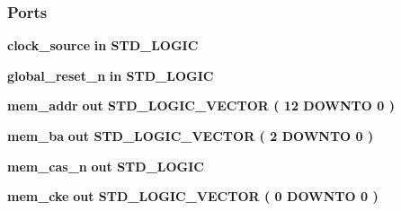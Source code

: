\subsubsection*{Ports}
 \begin{DoxyCompactItemize}
\item 
{\bf clock\+\_\+source}  {\bfseries {\bfseries \textcolor{keywordflow}{in}\textcolor{vhdlchar}{ }}} {\bfseries \textcolor{comment}{S\+T\+D\+\_\+\+L\+O\+G\+IC}\textcolor{vhdlchar}{ }} 
\item 
{\bf global\+\_\+reset\+\_\+n}  {\bfseries {\bfseries \textcolor{keywordflow}{in}\textcolor{vhdlchar}{ }}} {\bfseries \textcolor{comment}{S\+T\+D\+\_\+\+L\+O\+G\+IC}\textcolor{vhdlchar}{ }} 
\item 
{\bf mem\+\_\+addr}  {\bfseries {\bfseries \textcolor{keywordflow}{out}\textcolor{vhdlchar}{ }}} {\bfseries \textcolor{comment}{S\+T\+D\+\_\+\+L\+O\+G\+I\+C\+\_\+\+V\+E\+C\+T\+OR}\textcolor{vhdlchar}{ }\textcolor{vhdlchar}{(}\textcolor{vhdlchar}{ }\textcolor{vhdlchar}{ } \textcolor{vhdldigit}{12} \textcolor{vhdlchar}{ }\textcolor{keywordflow}{D\+O\+W\+N\+TO}\textcolor{vhdlchar}{ }\textcolor{vhdlchar}{ } \textcolor{vhdldigit}{0} \textcolor{vhdlchar}{ }\textcolor{vhdlchar}{)}\textcolor{vhdlchar}{ }} 
\item 
{\bf mem\+\_\+ba}  {\bfseries {\bfseries \textcolor{keywordflow}{out}\textcolor{vhdlchar}{ }}} {\bfseries \textcolor{comment}{S\+T\+D\+\_\+\+L\+O\+G\+I\+C\+\_\+\+V\+E\+C\+T\+OR}\textcolor{vhdlchar}{ }\textcolor{vhdlchar}{(}\textcolor{vhdlchar}{ }\textcolor{vhdlchar}{ } \textcolor{vhdldigit}{2} \textcolor{vhdlchar}{ }\textcolor{keywordflow}{D\+O\+W\+N\+TO}\textcolor{vhdlchar}{ }\textcolor{vhdlchar}{ } \textcolor{vhdldigit}{0} \textcolor{vhdlchar}{ }\textcolor{vhdlchar}{)}\textcolor{vhdlchar}{ }} 
\item 
{\bf mem\+\_\+cas\+\_\+n}  {\bfseries {\bfseries \textcolor{keywordflow}{out}\textcolor{vhdlchar}{ }}} {\bfseries \textcolor{comment}{S\+T\+D\+\_\+\+L\+O\+G\+IC}\textcolor{vhdlchar}{ }} 
\item 
{\bf mem\+\_\+cke}  {\bfseries {\bfseries \textcolor{keywordflow}{out}\textcolor{vhdlchar}{ }}} {\bfseries \textcolor{comment}{S\+T\+D\+\_\+\+L\+O\+G\+I\+C\+\_\+\+V\+E\+C\+T\+OR}\textcolor{vhdlchar}{ }\textcolor{vhdlchar}{(}\textcolor{vhdlchar}{ }\textcolor{vhdlchar}{ } \textcolor{vhdldigit}{0} \textcolor{vhdlchar}{ }\textcolor{keywordflow}{D\+O\+W\+N\+TO}\textcolor{vhdlchar}{ }\textcolor{vhdlchar}{ } \textcolor{vhdldigit}{0} \textcolor{vhdlchar}{ }\textcolor{vhdlchar}{)}\textcolor{vhdlchar}{ }} 

\end{DoxyCompactItemize}
